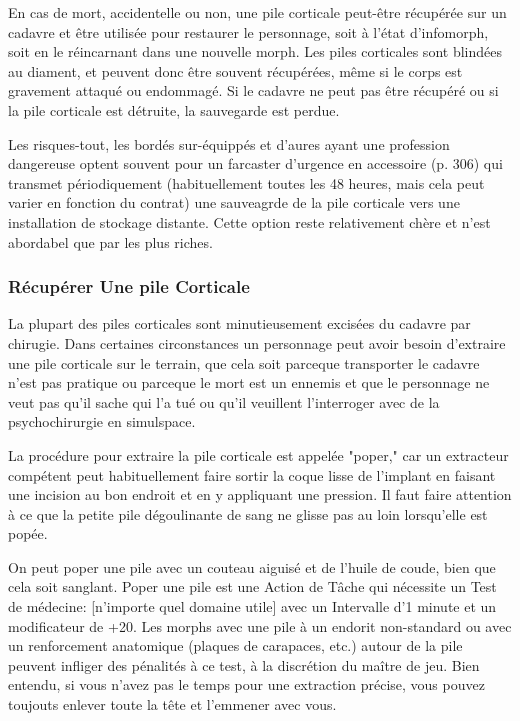 En cas de mort, accidentelle ou non, une pile corticale peut-être récupérée sur un cadavre et être utilisée pour restaurer le personnage, soit à l'état d'infomorph, soit en le réincarnant dans une nouvelle morph. Les piles corticales sont blindées au diament, et peuvent donc être souvent récupérées, même si le corps est gravement attaqué ou endommagé. Si le cadavre ne peut pas être récupéré ou si la pile corticale est détruite, la sauvegarde est perdue. 

Les risques-tout, les bordés sur-équippés et d'aures ayant une profession dangereuse optent souvent pour un farcaster d'urgence en accessoire (p. 306) qui transmet périodiquement (habituellement toutes les 48 heures, mais cela peut varier en fonction du contrat) une sauveagrde de la pile corticale vers une installation de stockage distante. Cette option reste relativement chère et n'est abordabel que par les plus riches. 

\subsubsection{Récupérer Une pile Corticale} 

La plupart des piles corticales sont minutieusement excisées du cadavre par chirugie. Dans certaines circonstances un personnage peut avoir besoin d'extraire une pile corticale sur le terrain, que cela soit parceque transporter le cadavre n'est pas pratique ou parceque le mort est un  ennemis et que le personnage ne veut pas qu'il sache qui l'a tué ou qu'il veuillent l'interroger avec de la psychochirurgie en simulspace. 

La procédure pour extraire la pile corticale est appelée "poper," car un extracteur compétent peut habituellement faire sortir la coque lisse de l'implant en faisant une incision au bon endroit et en y appliquant une pression. Il faut faire attention à ce que la petite pile dégoulinante de sang ne glisse pas au loin lorsqu'elle est popée. 

On peut poper une pile avec un couteau aiguisé et de l'huile de coude, bien que cela soit sanglant. Poper une pile est une Action de Tâche qui nécessite un Test de médecine: [n'importe quel domaine utile] avec un Intervalle d'1 minute et un modificateur de +20. Les morphs avec une pile à un endorit non-standard ou avec un renforcement anatomique (plaques de carapaces, etc.) autour de la pile peuvent infliger des pénalités à ce test, à la discrétion du maître de jeu. Bien entendu, si vous n'avez pas le temps pour une extraction précise, vous pouvez toujouts enlever toute la tête et l'emmener avec vous. 

